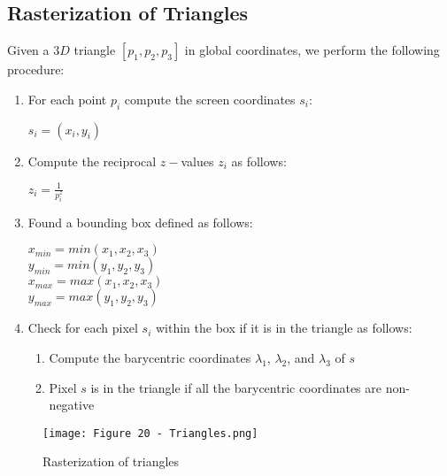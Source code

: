 \documentclass{article}
\begin{document}
\subsection{Rasterization of Triangles}
Given a $3D$ triangle $[p_1, p_2, p_3]$ in global coordinates, we perform the following procedure:
\begin{enumerate}
    \item For each point $p_i$ compute the screen coordinates $s_i$:
        \begin{center}
            $s_i = (x_i, y_i)$
        \end{center}
    \item Compute the reciprocal $z-$values $z_i$ as follows:
        \begin{center}
            $z_i = \displaystyle\frac{1}{p_i^z}$
        \end{center}
    \item Found a bounding box defined as follows:
        \begin{center}
            $x_{min} = min(x_1,x_2,x_3)$ \\
            $y_{min} = min(y_1, y_2, y_3)$ \\
            $x_{max} = max(x_1,x_2,x_3)$ \\
            $y_{max} = max(y_1, y_2, y_3)$
        \end{center}
    \item Check for each pixel $s_i$ within the box if it is in the triangle as follows:
        \begin{enumerate}
            \item Compute the barycentric coordinates $\lambda_1$, $\lambda_2$, and $\lambda_3$ of $s$
            \item Pixel $s$ is in the triangle if all the barycentric coordinates are non-negative
        \end{enumerate}
\end{enumerate}
\begin{figure}[H]
    \centering
    \texttt{[image: Figure 20 - Triangles.png]}
    \caption{Rasterization of triangles}
\end{figure}

\newpage

\end{document}
